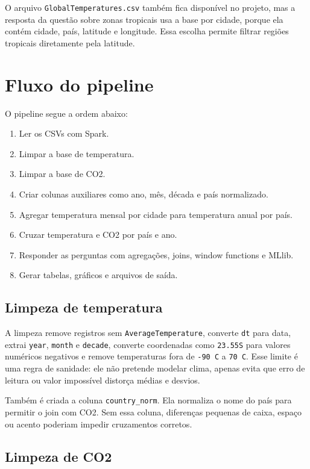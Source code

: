 \documentclass[12pt,a4paper]{article}
\begin{document}
O arquivo \texttt{GlobalTemperatures.csv} também fica disponível no projeto, mas a resposta da questão sobre zonas tropicais usa a base por cidade, porque ela contém cidade, país, latitude e longitude. Essa escolha permite filtrar regiões tropicais diretamente pela latitude.

\section{Fluxo do pipeline}

O pipeline segue a ordem abaixo:

\begin{enumerate}
    \item Ler os CSVs com Spark.
    \item Limpar a base de temperatura.
    \item Limpar a base de CO2.
    \item Criar colunas auxiliares como ano, mês, década e país normalizado.
    \item Agregar temperatura mensal por cidade para temperatura anual por país.
    \item Cruzar temperatura e CO2 por país e ano.
    \item Responder as perguntas com agregações, joins, window functions e MLlib.
    \item Gerar tabelas, gráficos e arquivos de saída.
\end{enumerate}

\subsection{Limpeza de temperatura}

A limpeza remove registros sem \texttt{AverageTemperature}, converte \texttt{dt} para data, extrai \texttt{year}, \texttt{month} e \texttt{decade}, converte coordenadas como \texttt{23.55S} para valores numéricos negativos e remove temperaturas fora de \texttt{-90 C} a \texttt{70 C}. Esse limite é uma regra de sanidade: ele não pretende modelar clima, apenas evita que erro de leitura ou valor impossível distorça médias e desvios.

Também é criada a coluna \texttt{country\_norm}. Ela normaliza o nome do país para permitir o join com CO2. Sem essa coluna, diferenças pequenas de caixa, espaço ou acento poderiam impedir cruzamentos corretos.

\subsection{Limpeza de CO2}
\end{document}
